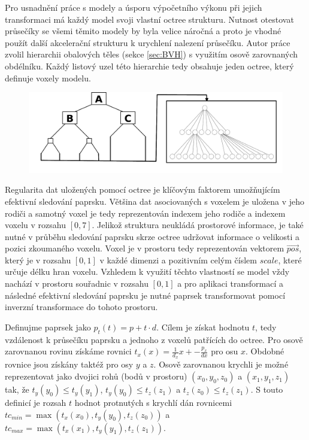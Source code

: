 Pro usnadnění práce s modely a úsporu výpočetního výkonu při jejich transformaci má každý model svoji vlastní octree strukturu. Nutnost otestovat průsečíky se všemi těmito modely by byla velice náročná a proto je vhodné použít další akcelerační strukturu k urychlení nalezení průsečíku. Autor práce zvolil hierarchii obalových těles (sekce \ref{sec:BVH}) s využitím osově zarovnaných obdélníku. Každý listový uzel této hierarchie tedy obsahuje jeden octree, který definuje voxely modelu. 

\begin{figure}[H]
	\centering
	\includegraphics[scale=1]{images/bvh_octree.png}
	\captionsetup{justification=centering}
	\label{fig:scene_bvh_repr}
\end{figure}

Regularita dat uložených pomocí octree je klíčovým faktorem umožňujícím efektivní sledování paprsku. Většina dat asociovaných s voxelem je uložena v jeho rodiči a samotný voxel je tedy reprezentován indexem jeho rodiče a indexem voxelu v rozsahu $[0, 7]$. Jelikož struktura neukládá prostorové informace, je také nutné v průběhu sledování paprsku skrze octree udržovat informace o velikosti a pozici zkoumaného voxelu. Voxel je v prostoru tedy reprezentován vektorem $\vec{pos}$, který je v rozsahu $[0, 1]$ v každé dimenzi a pozitivním celým číslem $scale$, které určuje délku hran voxelu. Vzhledem k využití těchto vlastností se model vždy nachází v prostoru souřadnic v rozsahu $[0, 1]$ a pro aplikaci transformací a následné efektivní sledování paprsku je nutné paprsek transformovat pomocí inverzní transformace do tohoto prostoru.

Definujme paprsek jako $p_t(t) = p + t\cdot d$. Cílem je získat hodnotu $t$, tedy vzdálenost k průsečíku paprsku a jednoho z voxelů patřících do octree. Pro osově zarovnanou rovinu získáme rovnici $t_x(x) = \frac{1}{d_x}x + -\frac{p_x}{dx}$ pro osu $x$. Obdobné rovnice jsou získány taktéž pro osy $y$ a $z$. Osově zarovnanou krychli je možné reprezentovat jako dvojici rohů (bodů v prostoru) $(x_0, y_0, z_0)$ a $(x_1, y_1, z_1)$ tak, že $t_y(y_0) \leq t_y(y_1)$, $t_y(y_0) \leq t_z(z_1)$ a $t_z(z_0) \leq t_z(z_1)$. S touto definicí je rozsah $t$ hodnot protnutých s krychlí dán rovnicemi $tc_{min} = \max(t_x(x_0), t_y(y_0), t_z(z_0))$ a $tc_{max} = \max(t_x(x_1), t_y(y_1), t_z(z_1))$.

